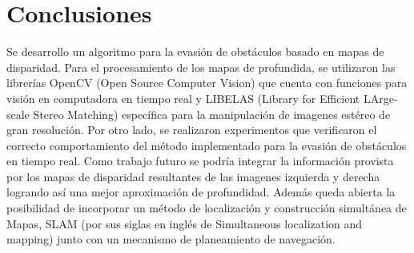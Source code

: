 \documentclass[journal]{IEEEtran}
\begin{document}
\section{Conclusiones}
\label{sec:conclusiones}
Se desarrollo un algoritmo para la evasi\'on de obst\'aculos basado en mapas de disparidad. Para el procesamiento de los mapas de profundida, se utilizaron las librer\'ias OpenCV (Open Source Computer Vision) que cuenta con funciones para visi\'on en computadora en tiempo real y LIBELAS (Library for Efficient LArge-scale Stereo Matching) espec\'ifica para la manipulaci\'on de imagenes est\'ereo de gran resoluci\'on. Por otro lado, se realizaron experimentos que verificaron el correcto comportamiento del m\'etodo implementado para la evasi\'on de obst\'aculos en tiempo real. Como trabajo futuro se podr\'ia integrar la informaci\'on provista por los mapas de disparidad resultantes de las imagenes izquierda y derecha logrando as\'i una mejor aproximaci\'on de profundidad. Adem\'as queda abierta la posibilidad de incorporar un m\'etodo de localizaci\'on y construcci\'on simult\'anea de Mapas, SLAM (por sus siglas en ingl\'es de Simultaneous localization and mapping) junto con un mecanismo de planeamiento de navegaci\'on.





\nocite{KNG10}
\nocite{G10}
\nocite{opencv}
\nocite{B00}
\nocite{H04}
\nocite{DPSC09}
\nocite{RH04}
\nocite{H09}




%
%

\end{document}
